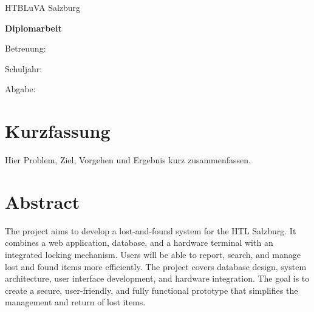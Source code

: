 \documentclass[12pt,a4paper,oneside]{scrreprt}
\begin{document}
\begin{titlepage}
\centering
{\Large HTBLuVA Salzburg\par}
\vspace{2cm}
{\huge\bfseries Diplomarbeit\par}
\vspace{1cm}
{\LARGE \Arbeitstitel\par}
\vspace{2cm}
{\large \Team\par}
\vfill
Betreuung: \Betreuung\par
Schuljahr: \Schuljahr\par
Abgabe: \Abgabedatum
\end{titlepage}
\chapter*{Kurzfassung}
Hier Problem, Ziel, Vorgehen und Ergebnis kurz zusammenfassen.
\chapter*{Abstract}
The project aims to develop a lost-and-found system for the HTL Salzburg. It combines a web application, database, and a hardware terminal with an integrated locking mechanism. Users will be able to report, search, and manage lost and found items more efficiently. The project covers database design, system architecture, user interface development, and hardware integration. The goal is to create a secure, user-friendly, and fully functional prototype that simplifies the management and return of lost items.
\tableofcontents
\clearpage
{}








\printbibliography[heading=bibintoc,title={Literaturverzeichnis}]
\appendix

\end{document}
